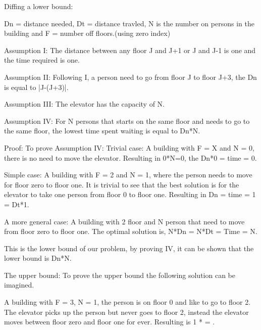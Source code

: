 Diffing a lower bound:

Dn = distance needed, Dt = distance travled, N is the number on persons in the building and F = number off floors.(using zero index)

Assumption I: The distance between any floor J and J+1 or J and J-1 is one and the time required is one. 

Assumption II: Following I, a person need to go from floor J to floor J+3, the Dn is equal to |J-(J+3)|.

Assumption III: The elevator has the capacity of N. 

Assumption IV: For N persons that starts on the same floor and needs to go to the same floor, the lowest time spent waiting is equal to Dn*N.

Proof: 
To prove Assumption IV: 
Trivial case: A building with F = X and N = 0, there is no need to move the elevator. Resulting in 0*N=0, the Dn*0 = time = 0.

Simple case: A building with F = 2 and N = 1, where the person needs to move for floor zero to floor one. It is trivial to see that the best solution is for the elevator to take one person from floor 0 to floor one. Resulting in Dn = time = 1 = Dt*1. 

A more general case: 
A building with 2 floor and N person that need to move from floor zero to floor one. The optimal solution is, N*Dn = N*Dt = Time = N.

This is the lower bound of our problem, by proving IV, it can be shown that the lower bound is Dn*N. 

The upper bound:
To prove the upper bound the following solution can be imagined.   

A building with F = 3, N = 1, the person is on floor 0 and like to go to floor 2. The elevator picks up the person but never goes to floor 2, instead the elevator moves between floor zero and floor one for ever. Resulting is  1 * \infty  =   \infty. 
